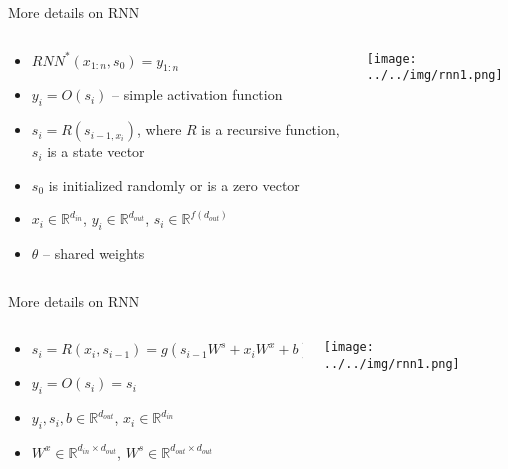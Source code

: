 \documentclass[usenames,dvipsnames,handout,aspectratio=169]{beamer}
\begin{document}
\begin{frame}{More details on RNN}	
\begin{columns}
\begin{column}{0.6\textwidth}

\begin{itemize}
	
\item $RNN^{*}(x_{1:n}, s_0) = y_{1:n}$ 
\item $y_i = O(s_i)$ – simple activation function 
\item $s_i = R(s_{i-1, x_i})$, where $R$ is a recursive function, $s_i$ is a state vector
\item $s_0$ is initialized randomly or is a zero vector
\item $x_i \in \mathbb{R}^{d_{in}}$, $y_i \in \mathbb{R}^{d_{out}}$, $s_i \in \mathbb{R}^{f(d_{out})}$ 
\item $\theta$ –  shared weights

\end{itemize}

\end{column}
\begin{column}{0.4\textwidth}  %
    \begin{center}
	\texttt{[image: ../../img/rnn1.png]}
     \end{center}
\end{column}
\end{columns}
\end{frame}




\begin{frame}{More details on RNN}	
\begin{columns}
\begin{column}{0.6\textwidth}

\begin{itemize}
	
\item $s_i = R(x_i, s_{i-1}) =g(s_{i-1}  W^s + x_i W^x + b)$
\item $y_i = O(s_i) = s_i$
\item $y_i, s_i, b \in \mathbb{R}^{d_{out}}$, $x_i \in \mathbb{R}^{d_{in}}$
\item $W^x \in \mathbb{R}^{d_{in} \times d_{out}}$, $W^s \in \mathbb{R}^{d_{out} \times d_{out}}$

\end{itemize}

\end{column}
\begin{column}{0.4\textwidth}  %
    \begin{center}
	\texttt{[image: ../../img/rnn1.png]}
     \end{center}
\end{column}
\end{columns}
\end{frame}
\end{document}
